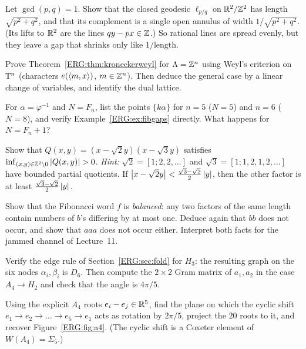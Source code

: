 \begin{exercise}
Let $\gcd(p,q)=1$. Show that the closed geodesic $\ell_{p/q}$ on $\mathbb{R}^2/\mathbb{Z}^2$ has length $\sqrt{p^2+q^2}$,
and that its complement is a single open annulus of width $1/\sqrt{p^2+q^2}$. (Its lifts to $\mathbb{R}^2$ are the
lines $qy-px\in\mathbb{Z}$.) So rational lines are spread evenly, but they leave a gap that shrinks only like
$1/\text{length}$.
\end{exercise}

\begin{exercise}
Prove Theorem~\ref{ERG:thm:kroneckerweyl} for $\Lambda=\mathbb{Z}^n$ using Weyl's criterion on $\mathbb{T}^n$ (characters
$e(\langle m, x\rangle)$, $m\in\mathbb{Z}^n$). Then deduce the general case by a linear change of variables, and identify
the dual lattice.
\end{exercise}

\begin{exercise}
For $\alpha=\varphi^{-1}$ and $N=F_n$, list the points $\{k\alpha\}$ for $n=5$ ($N=5$) and $n=6$
($N=8$), and verify Example~\ref{ERG:ex:fibgaps} directly. What happens for $N=F_n+1$?
\end{exercise}

\begin{exercise}\label{ERG:ex:oppenheim2}
Show that $Q(x,y)=(x-\sqrt2y)(x-\sqrt3y)$ satisfies $\inf_{(x,y)\in\mathbb{Z}^2\setminus0}\left\lvert Q(x,y) \right\rvert>0$.
\emph{Hint:} $\sqrt2=[1;2,2,\dots]$ and $\sqrt3=[1;1,2,1,2,\dots]$ have bounded partial quotients. If
$\left\lvert x-\sqrt2y \right\rvert<\frac{\sqrt3-\sqrt2}{2}\left\lvert y \right\rvert$, then the other factor is at least
$\frac{\sqrt3-\sqrt2}{2}\left\lvert y \right\rvert$.
\end{exercise}

\begin{exercise}
Show that the Fibonacci word $f$ is \emph{balanced}: any two factors of the same length contain numbers of
$b$'s differing by at most one. Deduce again that $bb$ does not occur, and show that $aaa$ does not occur
either. Interpret both facts for the jammed channel of Lecture~11.
\end{exercise}

\begin{exercise}
Verify the edge rule of Section~\ref{ERG:sec:fold} for $H_3$: the resulting graph on the
six nodes $\alpha_i,\beta_i$ is $D_6$. Then compute the $2\times2$ Gram matrix
of $a_1,a_2$ in the case $A_4\to H_2$ and check that the angle is $4\pi/5$.
\end{exercise}

\begin{exercise}
Using the explicit $A_4$ roots $e_i-e_j\in\mathbb{R}^5$, find the plane on which the cyclic shift
$e_1\to e_2\to\dots\to e_5\to e_1$ acts as rotation by $2\pi/5$, project the $20$ roots to it, and recover
Figure~\ref{ERG:fig:a4}. (The cyclic shift is a Coxeter element of $W(A_4)=\Sigma_5$.)
\end{exercise}

